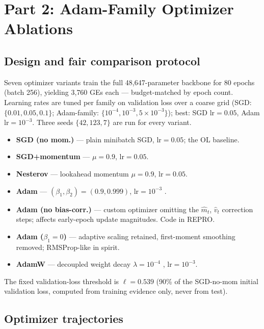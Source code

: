 \documentclass[conference]{IEEEtran}
\begin{document}
\section{Part 2: Adam-Family Optimizer Ablations}\label{sec:p2}

\subsection{Design and fair comparison protocol}\label{sec:p2:design}
Seven optimizer variants train the full 48{,}647-parameter backbone for 80
epochs (batch 256), yielding 3{,}760 GEs each --- budget-matched by
epoch count.
Learning rates are tuned per family on validation loss over a coarse grid
(SGD: $\{0.01, 0.05, 0.1\}$; Adam-family: $\{10^{-4}, 10^{-3}, 5\times10^{-3}\}$);
best: SGD lr$=0.05$, Adam lr$=10^{-3}$.
Three seeds $\{42, 123, 7\}$ are run for every variant.

\begin{itemize}[leftmargin=*]
\item \textbf{SGD (no mom.)} --- plain minibatch SGD, lr$=0.05$; the OL baseline.
\item \textbf{SGD+momentum} --- $\mu{=}0.9$, lr$=0.05$.
\item \textbf{Nesterov} --- lookahead momentum $\mu{=}0.9$, lr$=0.05$.
\item \textbf{Adam} --- $(\beta_1,\beta_2){=}(0.9,0.999)$, lr$=10^{-3}$
\cite{kingma2014adam}.
\item \textbf{Adam (no bias-corr.)} --- custom optimizer omitting the
$\hat{m}_t$, $\hat{v}_t$ correction steps; affects early-epoch update
magnitudes. Code in REPRO.
\item \textbf{Adam ($\beta_1{=}0$)} --- adaptive scaling retained, first-moment
smoothing removed; RMSProp-like in spirit.
\item \textbf{AdamW} --- decoupled weight decay $\lambda{=}10^{-4}$
\cite{loshchilov2019adamw}, lr$=10^{-3}$.
\end{itemize}

The fixed validation-loss threshold is $\ell{=}0.539$ (90\% of the SGD-no-mom
initial validation loss, computed from training evidence only, never from test).

\subsection{Optimizer trajectories}\label{sec:p2:traj}
\end{document}
